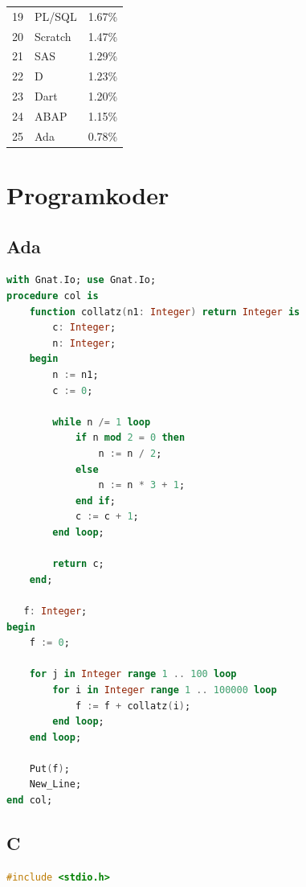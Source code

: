 \documentclass[12pt,swedish]{article}
\begin{document}
\begin{appendices}
\begin{table}[H]
\begin{tabular}{lll}
19        & PL/SQL               & 1.67\%      \\
20        & Scratch              & 1.47\%      \\
21        & SAS                  & 1.29\%      \\
22        & D                    & 1.23\%      \\
23        & Dart                 & 1.20\%      \\
24        & ABAP                 & 1.15\%      \\
25        & Ada                  & 0.78\%      \\ \bottomrule
\end{tabular}
\end{table}

\clearpage

\section{Programkoder}


\subsection{Ada}
\begin{lstlisting}[language=ada]
with Gnat.Io; use Gnat.Io;
procedure col is
    function collatz(n1: Integer) return Integer is
        c: Integer;
        n: Integer;
    begin
        n := n1;
        c := 0;

        while n /= 1 loop
            if n mod 2 = 0 then
                n := n / 2;
            else
                n := n * 3 + 1;
            end if;
            c := c + 1;
        end loop;

        return c;
    end;

   f: Integer;
begin
    f := 0;

    for j in Integer range 1 .. 100 loop
        for i in Integer range 1 .. 100000 loop
            f := f + collatz(i);
        end loop;
    end loop;

    Put(f);
    New_Line;
end col;
\end{lstlisting}


\newpage
\subsection{C}
\begin{lstlisting}[language=c]
#include <stdio.h>



\end{lstlisting}
\end{appendices}
\end{document}
